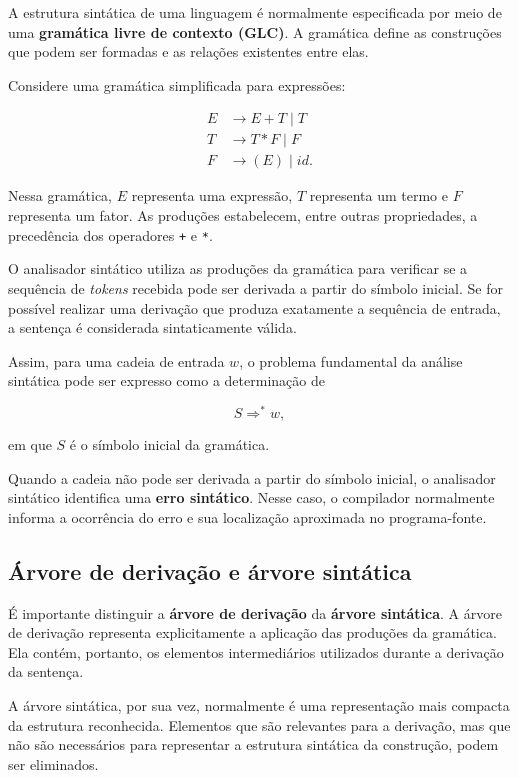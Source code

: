 \documentclass[
  brazilian,
  letterpaper,
]{book}
\theoremstyle{plain}
\theoremstyle{definition}
\theoremstyle{remark}
\begin{document}
A estrutura sintática de uma linguagem é normalmente especificada por
meio de uma \textbf{gramática livre de contexto (GLC)}. A gramática
define as construções que podem ser formadas e as relações existentes
entre elas.

Considere uma gramática simplificada para expressões:

\[
\begin{aligned}
E &\rightarrow E+T \mid T\\
T &\rightarrow T*F \mid F\\
F &\rightarrow (E) \mid id.
\end{aligned}
\]

Nessa gramática, \(E\) representa uma expressão, \(T\) representa um
termo e \(F\) representa um fator. As produções estabelecem, entre
outras propriedades, a precedência dos operadores \texttt{+} e
\texttt{*}.

O analisador sintático utiliza as produções da gramática para verificar
se a sequência de \emph{tokens} recebida pode ser derivada a partir do
símbolo inicial. Se for possível realizar uma derivação que produza
exatamente a sequência de entrada, a sentença é considerada
sintaticamente válida.

Assim, para uma cadeia de entrada \(w\), o problema fundamental da
análise sintática pode ser expresso como a determinação de

\[
S\Rightarrow^* w,
\]

em que \(S\) é o símbolo inicial da gramática.

Quando a cadeia não pode ser derivada a partir do símbolo inicial, o
analisador sintático identifica uma \textbf{erro sintático}. Nesse caso,
o compilador normalmente informa a ocorrência do erro e sua localização
aproximada no programa-fonte.

\subsection{Árvore de derivação e árvore
sintática}\label{uxe1rvore-de-derivauxe7uxe3o-e-uxe1rvore-sintuxe1tica}

É importante distinguir a \textbf{árvore de derivação} da \textbf{árvore
sintática}. A árvore de derivação representa explicitamente a aplicação
das produções da gramática. Ela contém, portanto, os elementos
intermediários utilizados durante a derivação da sentença.

A árvore sintática, por sua vez, normalmente é uma representação mais
compacta da estrutura reconhecida. Elementos que são relevantes para a
derivação, mas que não são necessários para representar a estrutura
sintática da construção, podem ser eliminados.
\end{document}
